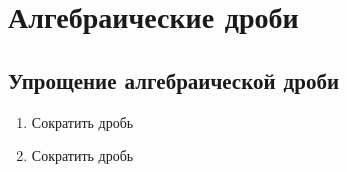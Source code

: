 \documentclass[10pt, a4paper]{article}
\begin{document}
		
\section{Алгебраические дроби}
\subsection{Упрощение алгебраической дроби}
\begin{enumerate}
	\item \leveli Сократить дробь
	\begin{multicols}{3}
		\begin{enumerate}
		\end{enumerate}
	\end{multicols}
	\item Сократить дробь
	\begin{multicols}{3}
		\begin{enumerate}

\end{enumerate}
\end{multicols}
\end{enumerate}
\end{document}
